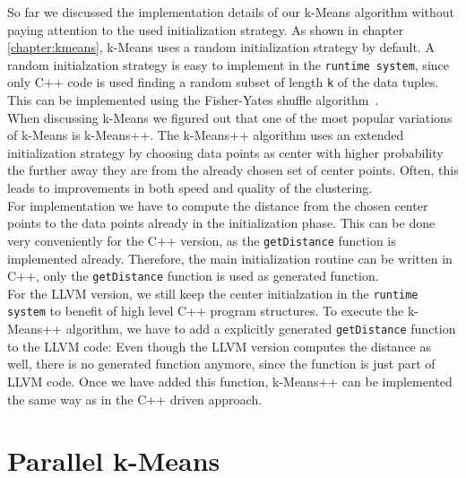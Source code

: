 So far we discussed the implementation details of our k-Means algorithm without paying attention to the used initialization strategy. As shown in chapter \ref{chapter:kmeans}, k-Means uses a random initialization strategy by default. A random initialzation strategy is easy to implement in the \texttt{runtime system}, since only C++ code is used finding a random subset of length \texttt{k} of the data tuples. This can be implemented using the Fisher-Yates shuffle algorithm~\parencite{fisheryates}. 
\\
When discussing k-Means we figured out that one of the most popular variations of k-Means is k-Means++. The k-Means++ algorithm uses an extended initialization strategy by choosing data points as center with higher probability the further away they are from the already chosen set of center points. Often, this leads to improvements in both speed and quality of the clustering.
\\
For implementation we have to compute the distance from the chosen center points to the data points already in the initialization phase. This can be done very conveniently for the C++ version, as the \texttt{getDistance} function is implemented already. Therefore, the main initialization routine can be written in C++, only the \texttt{getDistance} function is used as generated function.
\\
For the LLVM version, we still keep the center initialzation in the \texttt{runtime system} to benefit of high level C++ program structures. To execute the k-Means++ algorithm, we have to add a explicitly generated \texttt{getDistance} function to the LLVM code: Even though the LLVM version computes the distance as well, there is no generated function anymore, since the function is just part of LLVM code. Once we have added this function, k-Means++ can be implemented the same way as in the C++ driven approach.

\section{Parallel k-Means}\label{section:parallel_implementation}

